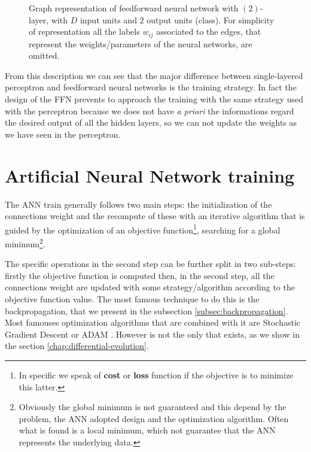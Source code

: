 \begin{figure}[t]
	\caption[Graph representation of feedforward neural network.]{Graph representation of feedforward neural network with $(2)$-layer, with $D$ input units and $2$ output units (class). For simplicity of representation all the labels $w_{ij}$ associated to the edges, that represent the weights/parameters of the neural networks, are omitted.}
	\label{fig:multilayer-perceptron}
\end{figure}

From this description we can see that the major difference between single-layered perceptron and feedforward neural networks is the training strategy. In fact the design of the FFN prevents to approach the training with the same strategy used with the perceptron because we does not have \textit{a priori} the informations regard the desired output of all the hidden layers, so we can not update the weights as we have seen in the perceptron.

\section{Artificial Neural Network training} 
The ANN train generally follows two main steps: the initialization of the connections weight and the recompute of these with an iterative algorithm that is guided by the optimization of an objective function\footnote{In specific we speak of \textbf{cost} or \textbf{loss} function if the objective is to minimize this latter.}, searching for a global minimum\footnote{Obviously the global minimum is not guaranteed and this depend by the problem, the ANN adopted design and the optimization algorithm. Often what is found is a local minimum, which not guarantee that the ANN represents the underlying data.}.

The specific operations in the second step can be further split in two sub-steps: firstly  the objective function is computed then, in the second step, all the connections weight are updated with some strategy/algorithm according to the objective function value. The most famous technique to do this is the backpropagation, that we present in the subsection \ref{subsec:backpropagation}. Most famouses optimization algorithms that are combined with it are Stochastic Gradient Descent \cite{DeepLearning:2016} or ADAM \cite{Kingma2014AdamAM}. However is not the only that exists, as we show in the section \ref{chap:differential-evolution}.

